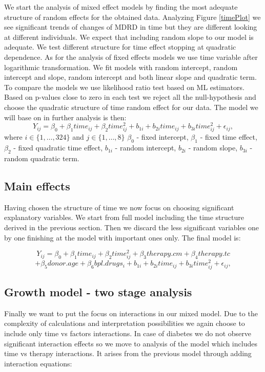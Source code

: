 \documentclass[num-refs]{wiley-article}
\begin{document}
We start the analysis of mixed effect models by finding the most adequate structure of random effects for the obtained data. Analyzing Figure \ref{timePlot} we see significant trends of changes of MDRD in time but they are different looking at different individuals. We expect that including random slope to our model is adequate. We test different structure for time effect stopping at quadratic dependence. As for the analysis of fixed effects models we use time variable after logarithmic transformation. We fit models with random intercept, random intercept and slope, random intercept and both linear slope and quadratic term. To compare the models we use likelihood ratio test based on ML estimators. Based on p-values close to zero in each test we reject all the null-hypothesis and choose the quadratic structure of time random effect for our data. The model we will base on in further analysis is then:
$$ Y_{ij} = \beta_0 + \beta_1 time_{ij} + \beta_2 time_{ij}^2 + b_{1i} + b_{2i} time_{ij} + b_{3i} time_{ij}^2 + \epsilon_{ij}, $$
where $ i \in \{1, \dots , 324\} $ and $ j \in \{1, \dots, 8\} $  \newline 
$\beta_0$ - fixed intercept,\newline
$\beta_1$ - fixed time effect,\newline
$\beta_2$ - fixed quadratic time effect,\newline
$b_{1i}$ - random intercept,\newline
$b_{2i}$ - random slope,\newline
$b_{3i}$ - random quadratic term.\newline


\subsection{Main effects}
Having chosen the structure of time we now focus on choosing significant explanatory variables. We start from full model including the time structure derived in the previous section. Then we discard the less significant variables one by one finishing at the model with important ones only. The final model is: 

$$ Y_{ij} = \beta_0 + \beta_1 time_{ij} + \beta_2 time_{ij}^2 + \beta_3 therapy.cm + \beta_4 therapy.tc $$
$$+ \beta_5 donor.age+ \beta_6 bpl.drugs_i  +  b_{1i} + b_{2i} time_{ij} + b_{3i} time_{ij}^2 + \epsilon_{ij}, $$


\subsection{Growth model - two stage analysis}
Finally we want to put the focus on interactions in our mixed model. Due to the complexity of calculations and interpretation possibilities we again choose to include only time vs factors interactions. In case of diabetes we do not observe significant interaction effects so we move to analysis of the model which includes time vs therapy interactions. It arises from the previous model through adding interaction equations:
\end{document}
